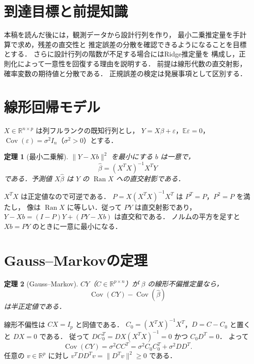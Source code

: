 \documentclass[a5paper,10pt,onecolumn]{jsarticle}
\makeatletter
\theoremstyle{mathnotetheorem}
\newtheorem{theorem}{定理}[section]
\renewcommand{\proofname}{証明}
\renewenvironment{proof}[1][\proofname]{%
  \par\pushQED{\qed}\normalfont\topsep4\p@\@plus2\p@\relax
  \trivlist\item[\hskip\labelsep\bfseries #1]\ignorespaces
}{\popQED\endtrivlist\@endpefalse}
\newcommand{\norm}[1]{\lVert #1\rVert}
\makeatother
\begin{document}
\section*{到達目標と前提知識}
本稿を読んだ後には，観測データから設計行列を作り，
最小二乗推定量を手計算で求め，残差の直交性と
推定誤差の分散を確認できるようになることを目標とする．
さらに設計行列の階数が不足する場合にはRidge推定量を
構成し，正則化によって一意性を回復する理由を説明する．
前提は線形代数の直交射影，確率変数の期待値と分散である．
正規誤差の検定は発展事項として区別する．

\section{線形回帰モデル}
$X\in\mathbb R^{n\times p}$ は列フルランクの既知行列とし，
$Y=X\beta+\varepsilon$，$\mathbb E\varepsilon=0$，
$\operatorname{Cov}(\varepsilon)=\sigma^2I_n$（$\sigma^2>0$）とする．
\begin{theorem}[最小二乗解]
$\norm{Y-Xb}^2$ を最小にする $b$ は一意で，
\[
 \widehat\beta=(X^TX)^{-1}X^TY
\]
である．予測値 $X\widehat\beta$ は $Y$ の $\operatorname{Ran}X$ への直交射影である．
\end{theorem}
\begin{proof}
$X^TX$ は正定値なので可逆である．
$P=X(X^TX)^{-1}X^T$ は $P^T=P$，$P^2=P$ を満たし，
像は $\operatorname{Ran}X$ に等しい．従って $PY$ は直交射影であり，
$Y-Xb=(I-P)Y+(PY-Xb)$ は直交和である．
ノルムの平方を足すと $Xb=PY$ のときに一意に最小になる．
\end{proof}
\section{Gauss--Markovの定理}
\begin{theorem}[Gauss--Markov]
$CY$（$C\in\mathbb R^{p\times n}$）が $\beta$ の線形不偏推定量なら，
\[
 \operatorname{Cov}(CY)-\operatorname{Cov}(\widehat\beta)
\]
は半正定値である．
\end{theorem}
\begin{proof}
線形不偏性は $CX=I_p$ と同値である．
$C_0=(X^TX)^{-1}X^T$，$D=C-C_0$ と置くと
$DX=0$ である．
従って $DC_0^T=DX(X^TX)^{-1}=0$ かつ $C_0D^T=0$．
よって
\[
 \operatorname{Cov}(CY)=\sigma^2CC^T
 =\sigma^2C_0C_0^T+\sigma^2DD^T.
\]
任意の $v\in\mathbb R^p$ に対し
$v^TDD^Tv=\norm{D^Tv}^2\ge0$ である．
\end{proof}
\end{document}
